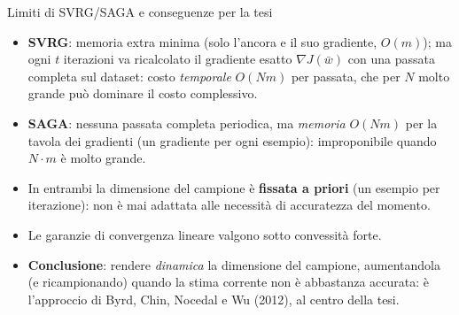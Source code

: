 \documentclass[aspectratio=169,11pt]{beamer}
\begin{document}
\begin{frame}{Limiti di SVRG/SAGA e conseguenze per la tesi}
  \begin{itemize}
    \item \textbf{SVRG}: memoria extra minima (solo l'ancora e il suo
      gradiente, $O(m)$); ma ogni $t$ iterazioni va ricalcolato il
      gradiente esatto $\nabla J(\bar w)$ con una passata completa sul
      dataset: costo \emph{temporale} $O(Nm)$ per passata, che per $N$
      molto grande può dominare il costo complessivo.
    \item \textbf{SAGA}: nessuna passata completa periodica, ma
      \emph{memoria} $O(Nm)$ per la tavola dei gradienti (un gradiente
      per ogni esempio): improponibile quando $N\cdot m$ è molto grande.
    \item In entrambi la dimensione del campione è \textbf{fissata a
      priori} (un esempio per iterazione): non è mai adattata
      alle necessità di accuratezza del momento.
    \item Le garanzie di convergenza lineare valgono sotto convessità forte.
    \item \textbf{Conclusione}: rendere \emph{dinamica} la dimensione del
      campione, aumentandola (e ricampionando) quando la stima corrente non
      è abbastanza accurata: è l'approccio di Byrd, Chin, Nocedal e Wu
      (2012), al centro della tesi.
  \end{itemize}
\end{frame}
\end{document}

